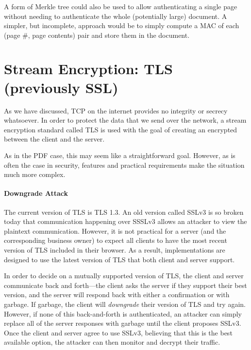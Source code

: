 A form of Merkle tree could also be used to allow
authenticating a single page without needing to
authenticate the whole (potentially large)
document. A simpler, but incomplete, approach
would be to simply compute a MAC of each (page \#,
page contents) pair and store them in the
document.

\section{Stream Encryption: TLS (previously SSL)}
As we have discussed, TCP on the internet provides no integrity or secrecy whatsoever. In order to protect the data that we send over the network, a stream encryption standard called TLS is used with the goal of creating an encrypted  between the client and the server.

As in the PDF case, this may seem like a straightforward goal. However, as is often the case in security, features and practical requirements make the situation much more complex.

\paragraph{Downgrade Attack} The current version of TLS is TLS 1.3. An old version called SSLv3 is so broken today that communication happening over SSSLv3 allows an attacker to view the plaintext communication. However, it is not practical for a server (and the corresponding business owner) to expect all clients to have the most recent version of TLS included in their browser. As a result, implementations are designed to use the latest version of TLS that both client and server support.

In order to decide on a mutually supported version of TLS, the client and server communicate back and forth---the client asks the server if they support their best version, and the server will respond back with either a confirmation or with garbage. If garbage, the client will \emph{downgrade} their version of TLS and try again. However, if none of this back-and-forth is authenticated, an attacker can simply replace all of the server responses with garbage until the client proposes SSLv3. Once the client and server agree to use SSLv3, believing that this is the best available option, the attacker can then monitor and decrypt their traffic.

